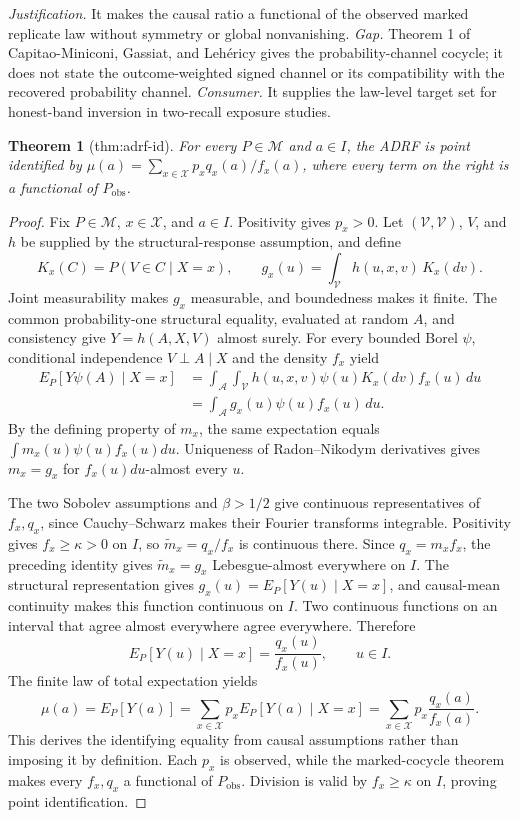 \documentclass{article}
\newtheorem{theorem}{Theorem}
\begin{document}
\par\smallskip\noindent \textit{Justification.} It makes the causal ratio a functional of the observed marked replicate law without symmetry or global nonvanishing. \textit{Gap.} Theorem 1 of Capitao-Miniconi, Gassiat, and Lehéricy gives the probability-channel cocycle; it does not state the outcome-weighted signed channel or its compatibility with the recovered probability channel. \textit{Consumer.} It supplies the law-level target set for honest-band inversion in two-recall exposure studies.

\begin{theorem}[thm:adrf-id]\label{thm:adrf-id}
For every \(P\in\mathcal M\) and \(a\in I\), the ADRF is point identified by \(\mu(a)=\sum_{x\in\mathcal X}p_xq_x(a)/f_x(a)\), where every term on the right is a functional of \(P_{\mathrm{obs}}\).
\end{theorem}
\begin{proof}
Fix \(P\in\mathcal M\), \(x\in\mathcal X\), and \(a\in I\). Positivity gives \(p_x>0\). Let \((\mathcal V,\mathscr V)\), \(V\), and \(h\) be supplied by the structural-response assumption, and define
\[
 K_x(C)=P(V\in C\mid X=x),
 \qquad
 g_x(u)=\int_{\mathcal V}h(u,x,v)\,K_x(dv).
\]
Joint measurability makes \(g_x\) measurable, and boundedness makes it finite. The common probability-one structural equality, evaluated at random \(A\), and consistency give \(Y=h(A,X,V)\) almost surely. For every bounded Borel \(\psi\), conditional independence \(V\perp A\mid X\) and the density \(f_x\) yield
\[
 \begin{aligned}
 E_P[Y\psi(A)\mid X=x]
 &=\int_{\mathcal A}\int_{\mathcal V}h(u,x,v)\psi(u)K_x(dv)f_x(u)\,du\\
 &=\int_{\mathcal A}g_x(u)\psi(u)f_x(u)\,du.
 \end{aligned}
\]
By the defining property of \(m_x\), the same expectation equals \(\int m_x(u)\psi(u)f_x(u)du\). Uniqueness of Radon--Nikodym derivatives gives \(m_x=g_x\) for \(f_x(u)du\)-almost every \(u\).

The two Sobolev assumptions and \(\beta>1/2\) give continuous representatives of \(f_x,q_x\), since Cauchy--Schwarz makes their Fourier transforms integrable. Positivity gives \(f_x\ge\kappa>0\) on \(I\), so \(\widetilde m_x=q_x/f_x\) is continuous there. Since \(q_x=m_xf_x\), the preceding identity gives \(\widetilde m_x=g_x\) Lebesgue-almost everywhere on \(I\). The structural representation gives \(g_x(u)=E_P[Y(u)\mid X=x]\), and causal-mean continuity makes this function continuous on \(I\). Two continuous functions on an interval that agree almost everywhere agree everywhere. Therefore
\[
 E_P[Y(u)\mid X=x]=\frac{q_x(u)}{f_x(u)},\qquad u\in I.
\]
The finite law of total expectation yields
\[
 \mu(a)=E_P[Y(a)]
 =\sum_{x\in\mathcal X}p_xE_P[Y(a)\mid X=x]
 =\sum_{x\in\mathcal X}p_x\frac{q_x(a)}{f_x(a)}.
\]
This derives the identifying equality from causal assumptions rather than imposing it by definition. Each \(p_x\) is observed, while the marked-cocycle theorem makes every \(f_x,q_x\) a functional of \(P_{\mathrm{obs}}\). Division is valid by \(f_x\ge\kappa\) on \(I\), proving point identification.
\end{proof}
\end{document}
